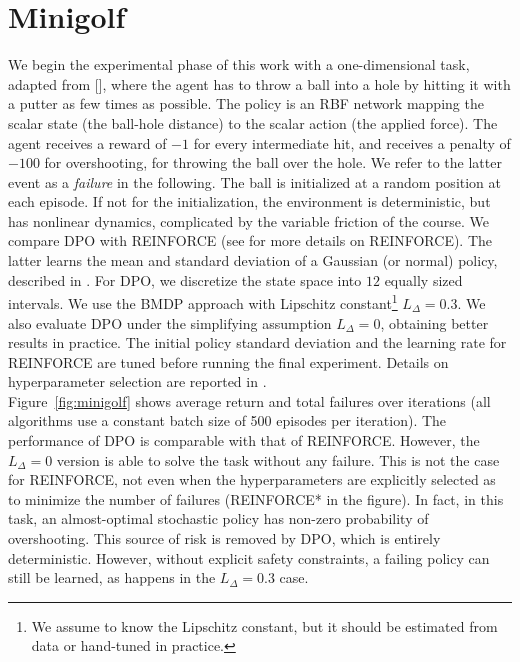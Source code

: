 \section{Minigolf}\label{sec:mini}
We begin the experimental phase of this work with a one-dimensional task, adapted from [\cite{doro2019gradient}], where the agent has to throw a ball into a hole by hitting it with a putter as few times as possible. The policy is an \ac{RBF} network mapping the scalar state (the ball-hole distance) to the scalar action (the applied force). 
The agent receives a reward of $-1$ for every intermediate hit, and receives a penalty of $-100$ for overshooting, \ie for throwing the ball over the hole. We refer to the latter event as a \textit{failure} in the following.
The ball is initialized at a random position at each episode. If not for the initialization, the environment is deterministic, but has nonlinear dynamics, complicated by the variable friction of the course.
We compare \ac{DPO} with REINFORCE (see  for more details on REINFORCE). The latter learns the mean and standard deviation of a Gaussian (or normal) policy, described in .
For \ac{DPO}, we discretize the state space into $12$ equally sized intervals. We use the \ac{BMDP} approach with Lipschitz constant\footnote{We assume to know the Lipschitz constant, but it should be estimated from data or hand-tuned in practice.} $L_{\Delta}=0.3$. We also evaluate \ac{DPO} under the simplifying assumption $L_{\Delta}=0$, obtaining better results in practice.
The initial policy standard deviation and the learning rate for REINFORCE are tuned before running the final experiment.
Details on hyperparameter selection are reported in .\\
\newline
Figure~\ref{fig:minigolf} shows average return and total failures over iterations (all algorithms use a constant batch size of 500 episodes per iteration). The performance of \ac{DPO} is comparable with that of REINFORCE. However, the $L_{\Delta}=0$ version is able to solve the task without any failure. This is not the case for REINFORCE, not even when the hyperparameters are explicitly selected as to minimize the number of failures (REINFORCE* in the figure). In fact, in this task, an almost-optimal stochastic policy has non-zero probability of overshooting. This source of risk is removed by \ac{DPO}, which is entirely deterministic. However, without explicit safety constraints, a failing policy can still be learned, as happens in the $L_{\Delta}=0.3$ case.
